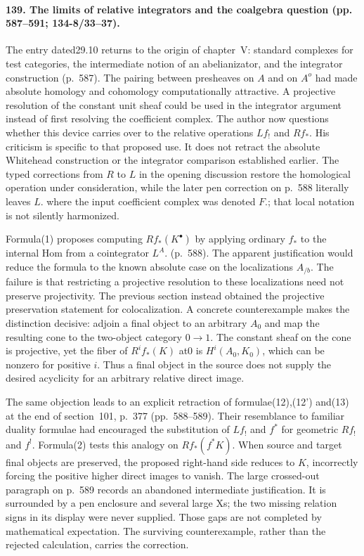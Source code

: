 \paragraph{139. The limits of relative integrators and the coalgebra question (pp. 587--591; 134-8/33--37).}
The entry dated29.10 returns to the origin of chapter~V: standard complexes for test categories, the intermediate notion of an abelianizator, and the integrator construction (p.~587). The pairing between presheaves on $A$ and on $A^o$ had made absolute homology and cohomology computationally attractive. A projective resolution of the constant unit sheaf could be used in the integrator argument instead of first resolving the coefficient complex. The author now questions whether this device carries over to the relative operations $Lf_!$ and $Rf_*$. His criticism is specific to that proposed use. It does not retract the absolute Whitehead construction or the integrator comparison established earlier. The typed corrections from $R$ to $L$ in the opening discussion restore the homological operation under consideration, while the later pen correction on p.~588 literally leaves $L.$ where the input coefficient complex was denoted $F.$; that local notation is not silently harmonized.

Formula(1) proposes computing $Rf_*(K^\bullet)$ by applying ordinary $f_*$ to the internal Hom from a cointegrator $L^A.$ (p.~588). The apparent justification would reduce the formula to the known absolute case on the localizations $A_{/b}$. The failure is that restricting a projective resolution to these localizations need not preserve projectivity. The previous section instead obtained the projective preservation statement for colocalization. A concrete counterexample makes the distinction decisive: adjoin a final object to an arbitrary $A_0$ and map the resulting cone to the two-object category $0\to1$. The constant sheaf on the cone is projective, yet the fiber of $R^if_*(K)$ at0 is $H^i(A_0,K_0)$, which can be nonzero for positive $i$. Thus a final object in the source does not supply the desired acyclicity for an arbitrary relative direct image.

The same objection leads to an explicit retraction of formulae(12),(12') and(13) at the end of section~101, p.~377 (pp.~588--589). Their resemblance to familiar duality formulae had encouraged the substitution of $Lf_!$ and $f^*$ for geometric $Rf_!$ and $f^!$. Formula(2) tests this analogy on $Rf_*(f^*K)$. When source and target final objects are preserved, the proposed right-hand side reduces to $K$, incorrectly forcing the positive higher direct images to vanish. The large crossed-out paragraph on p.~589 records an abandoned intermediate justification. It is surrounded by a pen enclosure and several large Xs; the two missing relation signs in its display were never supplied. Those gaps are not completed by mathematical expectation. The surviving counterexample, rather than the rejected calculation, carries the correction.


